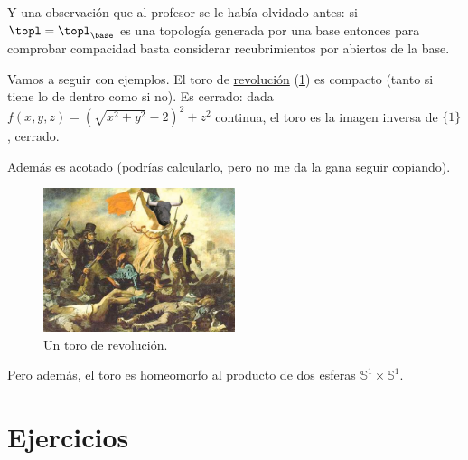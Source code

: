 \documentclass{apuntes}
\begin{document}
Y una observación que al profesor se le había olvidado antes: si $\topl=\topl_\base$ es una topología generada por una base entonces para comprobar compacidad basta considerar recubrimientos por abiertos de la base.

Vamos a seguir con ejemplos. El toro de \href{http://i.imgur.com/WLRV4HT.gif}{revolución} (\ref{figToroRevolucion}) es compacto (tanto si tiene lo de dentro como si no). Es cerrado: dada $f(x,y,z) = \left(\sqrt{x^2+y^2} - 2\right)^2 + z^2$ continua, el toro es la imagen inversa de $\{1\}$, cerrado.

Además es acotado (podrías calcularlo, pero no me da la gana seguir copiando).

\begin{figure}[hbtp]
\centering
\includegraphics[width=0.5\textwidth]{img/ToroRevolucion.jpg}
\caption{Un toro de revolución.}
\label{figToroRevolucion}
\end{figure}


Pero además, el toro es homeomorfo al producto de dos esferas $\mathbb{S}^1 × \mathbb{S}^1$.


\appendix
\chapter{Ejercicios}



\printindex
\end{document}
